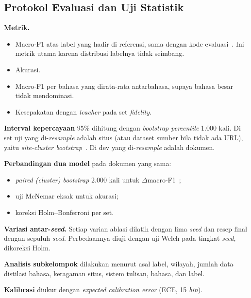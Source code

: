 \documentclass[journal]{IEEEtran}
\newcommand{\eng}[1]{\textit{#1}}   %
\begin{document}
\subsection{Protokol Evaluasi dan Uji Statistik}
\label{sec:protocol}
\textbf{Metrik.}
\begin{itemize}
  \item Macro-F1 atas label yang hadir di referensi, sama dengan kode evaluasi~\cite{kuzman2025llm}. Ini metrik utama karena distribusi labelnya tidak seimbang.
  \item Akurasi.
  \item Macro-F1 per bahasa yang dirata-rata antarbahasa, supaya bahasa besar tidak mendominasi.
  \item Kesepakatan dengan \eng{teacher} pada set \eng{fidelity}.
\end{itemize}

\textbf{Interval kepercayaan} 95\% dihitung dengan \eng{bootstrap percentile} 1.000 kali. Di set uji yang di-\eng{resample} adalah situs (atau dataset sumber bila tidak ada URL), yaitu \eng{site-cluster bootstrap}~\cite{field2007bootstrapping}. Di dev yang di-\eng{resample} adalah dokumen.

\textbf{Perbandingan dua model} pada dokumen yang sama:
\begin{itemize}
  \item \eng{paired (cluster) bootstrap} 2.000 kali untuk $\Delta$macro-F1~\cite{koehn2004significance};
  \item uji McNemar eksak untuk akurasi;
  \item koreksi Holm--Bonferroni per set.
\end{itemize}

\textbf{Variasi antar-\eng{seed}.} Setiap varian ablasi dilatih dengan lima \eng{seed} dan resep final dengan sepuluh \eng{seed}. Perbedaannya diuji dengan uji Welch pada tingkat \eng{seed}, dikoreksi Holm.

\textbf{Analisis subkelompok} dilakukan menurut asal label, wilayah, jumlah data distilasi bahasa, keragaman situs, sistem tulisan, bahasa, dan label.

\textbf{Kalibrasi} diukur dengan \eng{expected calibration error} (ECE, 15 \eng{bin}).
\end{document}
